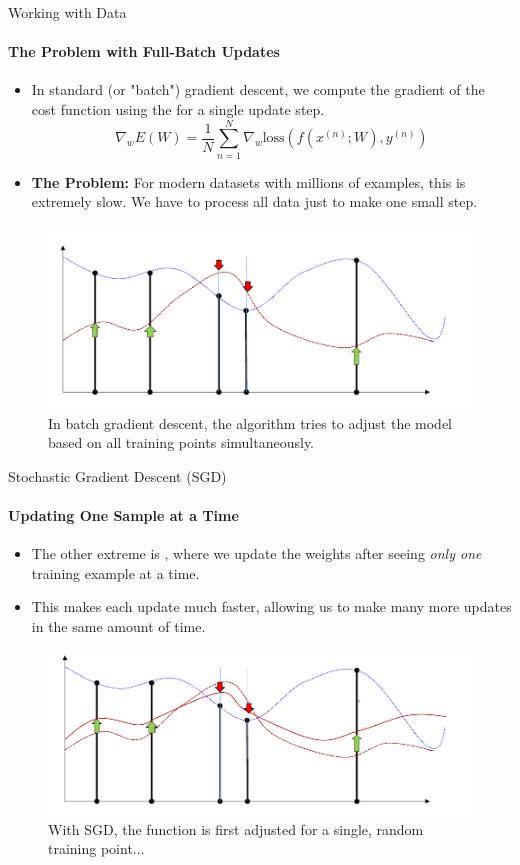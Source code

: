 \begin{frame}{Working with Data}
    \framesubtitle{The Problem with Full-Batch Updates}
    \small
    \begin{itemize}
        \item In standard (or "batch") gradient descent, we compute the gradient of the cost function using the  for a single update step.
        \[ \nabla_{w}E(W) = \frac{1}{N} \sum_{n=1}^{N} \nabla_{w}\text{loss}(f(x^{(n)}; W), y^{(n)}) \]
        \item \textbf{The Problem:} For modern datasets with millions of examples, this is extremely slow. We have to process all data just to make one small step.
    \end{itemize}
    \begin{figure}
        \centering
        \includegraphics[width=0.6\linewidth]{images/full_batch_idea.png}
        \caption{In batch gradient descent, the algorithm tries to adjust the model based on all training points simultaneously.}
    \end{figure}
\end{frame}

\begin{frame}{Stochastic Gradient Descent (SGD)}
    \framesubtitle{Updating One Sample at a Time}
    \begin{itemize}
        \item The other extreme is , where we update the weights after seeing \emph{only one} training example at a time.
        \item This makes each update much faster, allowing us to make many more updates in the same amount of time.
    \end{itemize}
    \begin{figure}
        \centering
        \includegraphics[width=0.7\linewidth]{images/sgd_step_1.png}
        \caption{With SGD, the function is first adjusted for a single, random training point...}
    \end{figure}
\end{frame}

